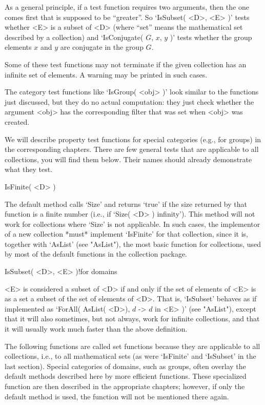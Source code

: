 As a general principle,  if a test function  requires two arguments, then
the one comes first  that is supposed  to  be ``greater''. So  `IsSubset(
<D>, <E> )' tests whether <E> is a subset of <D> (where ``set'' means the
mathematical set described  by a collection)  and `IsConjugate( $G$, $x$,
$y$ )' tests whether the group elements $x$ and  $y$ are conjugate in the
group $G$.

Some of  these test functions may not  terminate if  the given collection
has an infinite set of elements. A warning may be printed in such cases.

The category test functions  like `IsGroup( <obj>  )' look similar to the
functions just  discussed, but they  do no actual computation:  they just
check whether  the argument <obj> has the   corresponding filter that was
set when <obj> was created.

We will describe property  test  functions for special categories  (e.g.,
for groups)  in the corresponding  chapters. There are  few general tests
that  are applicable to all collections,  you will find them below. Their
names should already demonstrate what they test.

\>IsFinite( <D> )

The default method calls  `Size' and returns  `true' if the size returned
by that function is a finite number (i.e., if `Size( <D> ) \< infinity').
This method will not work for collections where `Size' is not applicable.
In such cases,  the  implementor  of a  new  collection *must*  implement
`IsFinite' for that collection, since  it is, together with `AsList' (see
"AsList"), the most  basic function for collections, used  by most of the
default functions in the collection package.

\>IsSubset( <D>, <E> )!{for domains}

<E> is considered a subset  of <D> if and only  if the set of elements of
<E> is  as  a set   a subset of  the set   of elements  of  <D>. That is,
`IsSubset' behaves as if implemented as `ForAll( AsList( <D>), $d$ -> $d$
in <E> )'  (see "AsList"), except  that  it will also  sometimes, but not
always, work for infinite collections, and that it will usually work much
faster than the above definition.


The  following  functions  are called  set  functions  because  they  are
applicable to  all collections, i.e.,  to all mathematical  sets (as were
`IsFinite' and `IsSubset'  in  the last  section). Special  categories of
domains, such as groups, often overlay the default methods described here
by  more   efficient  functions.  These  specialized   function  are then
described  in  the appropriate  chapters;   however, if only the  default
method is used, the function will not be mentioned there again.

